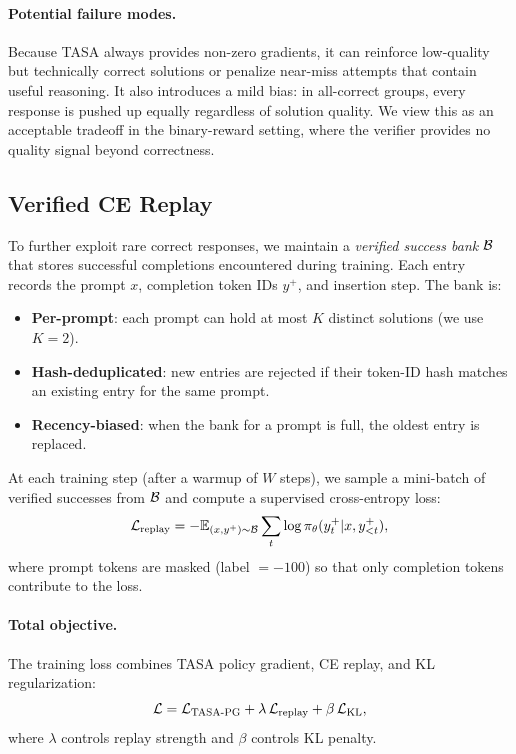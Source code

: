 \paragraph{Potential failure modes.}
Because TASA always provides non-zero gradients, it can reinforce low-quality but technically correct solutions or penalize near-miss attempts that contain useful reasoning.
It also introduces a mild bias: in all-correct groups, every response is pushed up equally regardless of solution quality.
We view this as an acceptable tradeoff in the binary-reward setting, where the verifier provides no quality signal beyond correctness.

\subsection{Verified CE Replay}
\label{sec:replay}

To further exploit rare correct responses, we maintain a \emph{verified success bank} $\mathcal{B}$ that stores successful completions encountered during training.
Each entry records the prompt $x$, completion token IDs $y^+$, and insertion step.
The bank is:
\begin{itemize}[leftmargin=*,topsep=2pt,itemsep=1pt]
\item \textbf{Per-prompt}: each prompt can hold at most $K$ distinct solutions (we use $K{=}2$).
\item \textbf{Hash-deduplicated}: new entries are rejected if their token-ID hash matches an existing entry for the same prompt.
\item \textbf{Recency-biased}: when the bank for a prompt is full, the oldest entry is replaced.
\end{itemize}

At each training step (after a warmup of $W$ steps), we sample a mini-batch of verified successes from $\mathcal{B}$ and compute a supervised cross-entropy loss:
\begin{equation}
\label{eq:replay}
\mathcal{L}_{\mathrm{replay}} = -\mathbb{E}_{(x, y^+) \sim \mathcal{B}} \sum_t \log \pi_{\theta}(y^+_t | x, y^+_{<t}),
\end{equation}
where prompt tokens are masked (label $= {-}100$) so that only completion tokens contribute to the loss.

\paragraph{Total objective.}
The training loss combines TASA policy gradient, CE replay, and KL regularization:
\begin{equation}
\label{eq:total}
\mathcal{L} = \mathcal{L}_{\mathrm{TASA\text{-}PG}} + \lambda \, \mathcal{L}_{\mathrm{replay}} + \beta \, \mathcal{L}_{\mathrm{KL}},
\end{equation}
where $\lambda$ controls replay strength and $\beta$ controls KL penalty.

